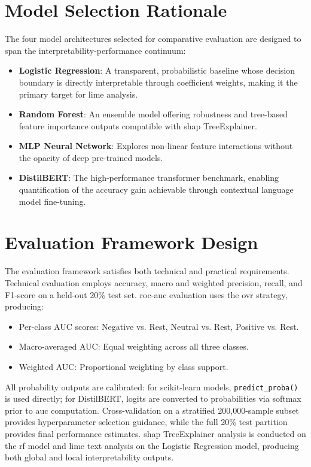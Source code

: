 \section{Model Selection Rationale}

The four model architectures selected for comparative evaluation are designed to span the interpretability-performance continuum:

\begin{itemize}
  \item \textbf{Logistic Regression}: A transparent, probabilistic baseline whose decision boundary is directly interpretable through coefficient weights, making it the primary target for \gls{lime} analysis.
  \item \textbf{Random Forest}: An ensemble model offering robustness and tree-based feature importance outputs compatible with \gls{shap} TreeExplainer.
  \item \textbf{MLP Neural Network}: Explores non-linear feature interactions without the opacity of deep pre-trained models.
  \item \textbf{DistilBERT}: The high-performance transformer benchmark, enabling quantification of the accuracy gain achievable through contextual language model fine-tuning.
\end{itemize}

\section{Evaluation Framework Design}

The evaluation framework satisfies both technical and practical requirements. Technical evaluation employs accuracy, macro and weighted precision, recall, and F1-score on a held-out 20\% test set. \gls{roc}-\gls{auc} evaluation uses the \gls{ovr} strategy, producing:

\begin{itemize}
  \item Per-class AUC scores: Negative vs. Rest, Neutral vs. Rest, Positive vs. Rest.
  \item Macro-averaged AUC: Equal weighting across all three classes.
  \item Weighted AUC: Proportional weighting by class support.
\end{itemize}

All probability outputs are calibrated: for scikit-learn models, \texttt{predict\_proba()} is used directly; for DistilBERT, logits are converted to probabilities via softmax prior to \gls{auc} computation. Cross-validation on a stratified 200,000-sample subset provides hyperparameter selection guidance, while the full 20\% test partition provides final performance estimates. \gls{shap} TreeExplainer analysis is conducted on the \gls{rf} model and \gls{lime} text analysis on the Logistic Regression model, producing both global and local interpretability outputs.
